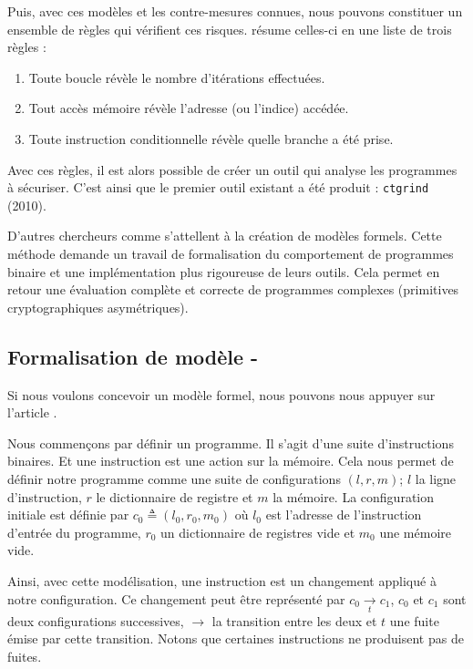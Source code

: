 Puis, avec ces modèles et les contre-mesures connues, nous pouvons constituer un ensemble de règles qui vérifient ces risques. \cite{CTsaferCrypto} résume celles-ci en une liste de trois règles :
\begin{enumerate}
  \item Toute boucle révèle le nombre d'itérations effectuées. 
  \item Tout accès mémoire révèle l'adresse (ou l'indice) accédée.
  \item Toute instruction conditionnelle révèle quelle branche a été prise.
\end{enumerate}

Avec ces règles, il est alors possible de créer un outil qui analyse les programmes à sécuriser. C'est ainsi que le premier outil existant a été produit : \texttt{ctgrind} (2010).\medbreak

D'autres chercheurs comme \citeauthor{binsecRel2019} \cite{binsecRel2019} s'attellent à la création de modèles formels. Cette méthode demande un travail de formalisation du comportement de programmes binaire et une implémentation plus rigoureuse de leurs outils. Cela permet en retour une évaluation complète et correcte de programmes complexes (\ie primitives cryptographiques asymétriques).

\subsection*{Formalisation de modèle - \cite{binsecRel2019}}

Si nous voulons concevoir un modèle formel, nous pouvons nous appuyer sur l'article  \cite{formalConstantTime}.\medbreak


Nous commençons par définir un programme. Il s'agit d'une suite d'instructions binaires. Et une instruction est une action sur la mémoire. Cela nous permet de définir notre programme comme une suite de configurations $(l,r,m)$; $l$ la ligne d'instruction, $r$ le dictionnaire de registre et $m$ la mémoire. La configuration initiale est définie par $c_0 \triangleq (l_0,r_0,m_0)$ où $l_0$ est l'adresse de l'instruction d'entrée du programme, $r_0$ un dictionnaire de registres vide et $m_0$ une mémoire vide.\smallbreak

Ainsi, avec cette modélisation, une instruction est un changement appliqué à notre configuration. Ce changement peut être représenté par $ c_0 \underset{t}{\to} c_1 $, $c_0$ et $c_1$ sont deux configurations successives, $\to$ la transition entre les deux et $t$ une fuite émise par cette transition. Notons que certaines instructions ne produisent pas de fuites.\smallbreak

